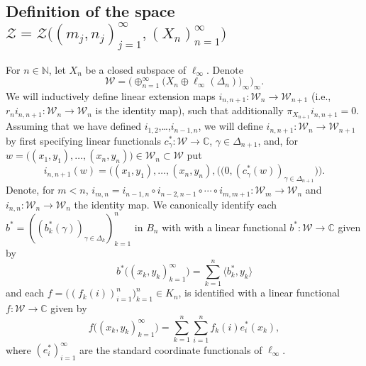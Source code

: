 \documentclass[11pt]{amsart}
\theoremstyle{definition}
\newcommand{\N}{\mathbb{N}}
\newcommand{\C}{\mathbb{C}}
\numberwithin{equation}{section}
\begin{document}
\subsection{Definition of the space $\mathcal{Z} = \mathcal{Z}\big((m_j,n_j)_{j=1}^\infty,(X_n)_{n=1}^\infty\big)$}

For $n\in\N$, let $X_n$ be a closed subspace of $\ell_\infty$. Denote
\[\mathcal{W} = \big(\oplus_{n=1}^\infty\big(X_n\oplus\ell_\infty(\Delta_n)\big)_\infty\big)_\infty.\]
%
We will inductively define linear extension maps $i_{n,n+1}:\mathcal{W}_n\to\mathcal{W}_{n+1}$ (i.e., $r_n i_{n,n+1}:\mathcal{W}_{n}\to \mathcal{W}_{n}$ is the identity map), such that additionally $\pi_{X_{n+1}} i_{n,n+1} = 0$. Assuming that we have defined $i_{1,2}$,\ldots,$i_{n-1,n}$, we will define $i_{n,n+1}:\mathcal{W}_n\to\mathcal{W}_{n+1}$ by first specifying  linear functionals $c_\gamma^*:\mathcal{W}\to\C$, $\gamma\in\Delta_{n+1}$, and, for $w = \big((x_1,y_1),\ldots,(x_n,y_n)\big)\in\mathcal{W}_n\subset\mathcal{W}$ put
\[i_{n,n+1}(w) = \Big((x_1,y_1),\ldots,(x_n,y_n),\big((0,(c_\gamma^*(w))_{\gamma\in\Delta_{n+1}}\big)\Big).\]
Denote, for $m<n$, $i_{m,n} = i_{n-1,n}\circ i_{n-2,n-1}\circ\cdots\circ i_{m,m+1}:\mathcal{W}_m\to\mathcal{W}_n$ and $i_{n,n}:\mathcal{W}_n\to\mathcal{W}_n$ the identity map. We canonically identify each $b^* = ((b_k^*(\gamma))_{\gamma\in\Delta_k})_{k=1}^n$ in $B_n$ with with a linear functional $b^*:\mathcal{W}\to\C$ given by
\begin{equation}
\label{delta-one tops}
b^*\big((x_k,y_k)_{k=1}^\infty\big) = \sum_{k=1}^n\langle b_k^*,y_k\rangle
\end{equation}
and each $f = \big((f_k(i))_{i=1}^n\big)_{k=1}^n\in K_n$, is identified with a linear functional $f:\mathcal{W}\to\C$ given by
\begin{equation}
\label{delta-zero tops}
f\big((x_k,y_k)_{k=1}^\infty\big) = \sum_{k=1}^n\sum_{i=1}^nf_k(i)e_i^*(x_k),
\end{equation}
where $(e_i^*)_{i=1}^\infty$ are the standard coordinate functionals of $\ell_\infty$.
 
\end{document}
